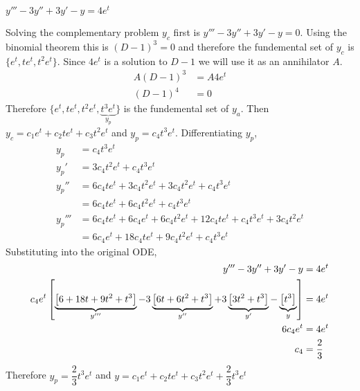 $y'''-3y'' + 3y' - y= 4e^t$

\soln Solving the complementary problem $y_c$ first is $y'''-3y'' + 3y' - y= 0$. Using the binomial theorem this is $(D-1)^3 = 0$ and therefore the fundemental set of $y_c$ is $\{ e^t, te^t, t^2e^t\}$. Since $4e^t$ is a solution to $D-1$ we will use it as an annihilator $A$. 
\begin{align*}
    A(D-1)^3 &= A 4e^t\\
    (D-1)^4 &= 0
\end{align*}
Therefore $\{ e^t, te^t, t^2e^t, \underbrace{t^3e^t}_{y_p}\}$ is the fundemental set of $y_a$. Then $y_c = c_1e^t + c_2te^t + c_3t^2 e^t$ and $y_p = c_4 t^3 e^t$. Differentiating $y_p$,
\begin{align*}
    y_p &= c_4 t^3 e^t\\
    y_p' &= 3 c_4 t^2 e^t + c_4 t^3 e^t\\
    y_p'' &= 6c_4 t e^t + 3c_4 t^2 e^t + 3c_4t^2e^t + c_4 t^3 e^t\\
        &= 6c_4 t e^t + 6c_4 t^2 e^t + c_4 t^3 e^t\\
    y_p''' &= 6c_4 t e^t + 6c_4 e^t + 6c_4 t^2 e^t + 12c_4 t e^t + c_4 t^3 e^t + 3c_4 t^2 e^t\\
    &= 6c_4 e^t + 18c_4 t e^t  + 9c_4 t^2 e^t + c_4 t^3 e^t
\end{align*}
Substituting into the original ODE,
\begin{align*}
    y'''-3y'' + 3y' - y &= 4e^t\\
    c_4e^t\brac{\underbrace{\brac{6+ 18t  + 9 t^2 +  t^3 }}_{y'''} - 3 \underbrace{\brac{ 6 t  + 6 t^2  +  t^3  }}_{y''} + 3 \underbrace{\brac{3  t^2  +  t^3 }}_{y'} - \underbrace{\brac{  t^3 }}_{y}} &= 4e^t\\
    6 c_4e^t &= 4e^t\\
    c_4 &= \frac23
\end{align*}
Therefore $y_p = \dfrac23 t^3 e^t$ and $y = c_1e^t + c_2te^t + c_3t^2 e^t + \dfrac23 t^3 e^t$